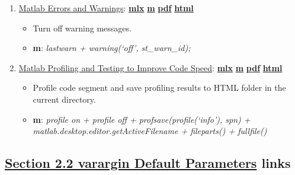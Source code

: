\documentclass[
]{book}
\providecommand{\tightlist}{%
  \setlength{\itemsep}{0pt}\setlength{\parskip}{0pt}}
\begin{document}
\begin{enumerate}
\def\labelenumi{\arabic{enumi}.}
\tightlist
\item
  \href{https://fanwangecon.github.io/M4Econ/function/programming/htmlpdfm/fs_error_warning.html}{Matlab Errors and Warnings}: \href{https://github.com/FanWangEcon/M4Econ/blob/master/function/programming/fs_error_warning.mlx}{\textbf{mlx}} \textbar{} \href{https://github.com/FanWangEcon/M4Econ/blob/master/function/programming/htmlpdfm/fs_error_warning.m}{\textbf{m}} \textbar{} \href{https://github.com/FanWangEcon/M4Econ/blob/master/function/programming/htmlpdfm/fs_error_warning.pdf}{\textbf{pdf}} \textbar{} \href{https://fanwangecon.github.io/M4Econ/function/programming/htmlpdfm/fs_error_warning.html}{\textbf{html}}

  \begin{itemize}
  \tightlist
  \item
    Turn off warning messages.
  \item
    \textbf{m}: \emph{lastwarn + warning(`off', st\_warn\_id);}
  \end{itemize}
\item
  \href{https://fanwangecon.github.io/M4Econ/function/programming/htmlpdfm/fs_profiler_tester.html}{Matlab Profiling and Testing to Improve Code Speed}: \href{https://github.com/FanWangEcon/M4Econ/blob/master/function/programming/fs_profiler_tester.mlx}{\textbf{mlx}} \textbar{} \href{https://github.com/FanWangEcon/M4Econ/blob/master/function/programming/htmlpdfm/fs_profiler_tester.m}{\textbf{m}} \textbar{} \href{https://github.com/FanWangEcon/M4Econ/blob/master/function/programming/htmlpdfm/fs_profiler_tester.pdf}{\textbf{pdf}} \textbar{} \href{https://fanwangecon.github.io/M4Econ/function/programming/htmlpdfm/fs_profiler_tester.html}{\textbf{html}}

  \begin{itemize}
  \tightlist
  \item
    Profile code segment and save profiling results to HTML folder in the current directory.
  \item
    \textbf{m}: \emph{profile on + profile off + profsave(profile(`info'), spn) + matlab.desktop.editor.getActiveFilename + fileparts() + fullfile()}
  \end{itemize}
\end{enumerate}

\hypertarget{section-2.2-varargin-default-parametersvarargin-default-parameters-links}{%
\subsection{\texorpdfstring{\protect\hyperlink{varargin-default-parameters}{Section 2.2 varargin Default Parameters} links}{Section 2.2 varargin Default Parameters links}}\label{section-2.2-varargin-default-parametersvarargin-default-parameters-links}}
\end{document}
